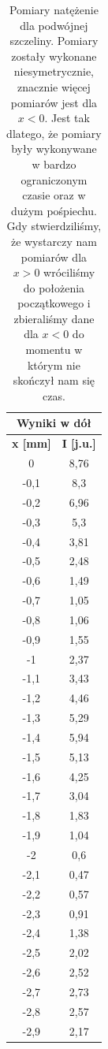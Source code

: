 \documentclass{fizykalab}
\begin{document}
\begin{table}[H]
    \centering
    \caption{Pomiary natężenie dla podwójnej szczeliny. Pomiary zostały wykonane
    niesymetrycznie, znacznie więcej pomiarów jest dla $x < 0$. Jest tak dlatego, że
    pomiary były wykonywane w bardzo ograniczonym czasie oraz w dużym pośpiechu.
    Gdy stwierdziliśmy, że wystarczy nam pomiarów dla $x > 0$ wróciliśmy do 
    położenia początkowego i  zbieraliśmy dane dla $x < 0$ do momentu 
    w którym nie skończył nam się czas.
    }
    \begin{tabular}{|c|c|}
        \hline
        \multicolumn{2}{|c|}{Wyniki w dół} \\ \hline
        \textbf{x [mm]} & \textbf{I [j.u.]} \\ \hline
        0 & 8,76 \\ \hline
        -0,1 & 8,3 \\ \hline
        -0,2 & 6,96 \\ \hline
        -0,3 & 5,3 \\ \hline
        -0,4 & 3,81 \\ \hline
        -0,5 & 2,48 \\ \hline
        -0,6 & 1,49 \\ \hline
        -0,7 & 1,05 \\ \hline
        -0,8 & 1,06 \\ \hline
        -0,9 & 1,55 \\ \hline
        -1 & 2,37 \\ \hline
        -1,1 & 3,43 \\ \hline
        -1,2 & 4,46 \\ \hline
        -1,3 & 5,29 \\ \hline
        -1,4 & 5,94 \\ \hline
        -1,5 & 5,13 \\ \hline
        -1,6 & 4,25 \\ \hline
        -1,7 & 3,04 \\ \hline
        -1,8 & 1,83 \\ \hline
        -1,9 & 1,04 \\ \hline
        -2 & 0,6 \\ \hline
        -2,1 & 0,47 \\ \hline
        -2,2 & 0,57 \\ \hline
        -2,3 & 0,91 \\ \hline
        -2,4 & 1,38 \\ \hline
        -2,5 & 2,02 \\ \hline
        -2,6 & 2,52 \\ \hline
        -2,7 & 2,73 \\ \hline
        -2,8 & 2,57 \\ \hline
        -2,9 & 2,17 \\ \hline
        

\end{tabular}
\end{table}
\end{document}
